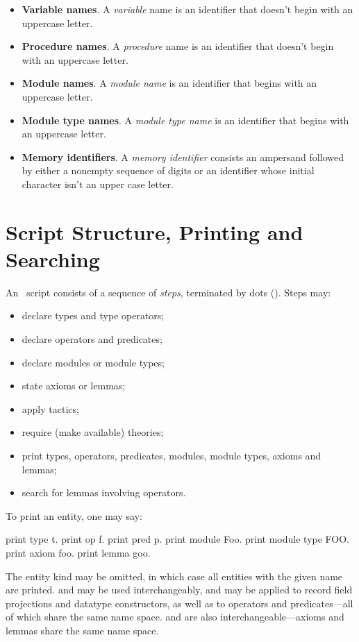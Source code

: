 \begin{itemize}
\item \textbf{Variable names}. A \emph{variable} name is an identifier
  that doesn't begin with an uppercase letter.

\item \textbf{Procedure names}. A \emph{procedure} name is an identifier
  that doesn't begin with an uppercase letter.

\item \textbf{Module names}. A \emph{module name} is an identifier that
  begins with an uppercase letter.

\item \textbf{Module type names}. A \emph{module type name} is an
  identifier that begins with an uppercase letter.

\item \textbf{Memory identifiers}. A \emph{memory identifier} consists
  an ampersand followed by either a nonempty sequence of digits or an
  identifier whose initial character isn't an upper case letter.
\end{itemize}

\section{Script Structure, Printing and Searching}

An \EasyCrypt\ script consists of a sequence of \emph{steps},
terminated by dots (). Steps may:
\begin{itemize}
\item declare types and type operators;

\item declare operators and predicates;

\item declare modules or module types;

\item state axioms or lemmas;

\item apply tactics;

\item require (make available) theories;

\item print types, operators, predicates, modules, module types,
  axioms and lemmas;

\item search for lemmas involving operators.
\end{itemize}

To print an entity, one may say:
\begin{easycrypt}{}{}
print type t.
print op f.
print pred p.
print module Foo.
print module type FOO.
print axiom foo.
print lemma goo.
\end{easycrypt}
The entity kind may be omitted, in which case all entities with the
given name are printed.  and  may be used
interchangeably, and may be applied to record field projections and
datatype constructors, as well as to operators and predicates---all of which
share the same name space.
 and  are also interchangeable---axioms
and lemmas share the same name space.


